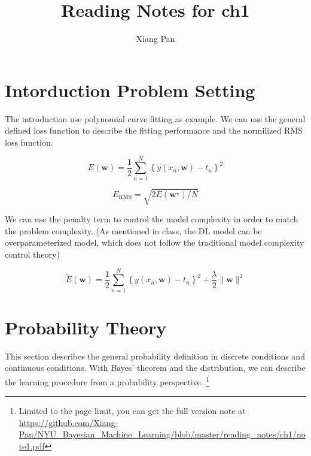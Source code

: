 \documentclass{article}
\title{Reading Notes for ch1}
\author{Xiang Pan}
\begin{document}

\section{Intorduction Problem Setting}
The introduction use polynomial curve fitting as example. We can use the general defined loss function to describe the fitting performance and the normilized RMS loss function.




$$E(\mathbf{w})=\frac{1}{2} \sum_{n=1}^{N}\left\{y\left(x_{n}, \mathbf{w}\right)-t_{n}\right\}^{2}$$

$$E_{\mathrm{RMS}}=\sqrt{2 E\left(\mathbf{w}^{\star}\right) / N}$$

We can use the penalty term to control the model complexity in order to match the problem complexity. (As mentioned in class, the DL model can be overparameterized model, which does not follow the traditional model complexity control theory)

$$\widetilde{E}(\mathbf{w})=\frac{1}{2} \sum_{n=1}^{N}\left\{y\left(x_{n}, \mathbf{w}\right)-t_{n}\right\}^{2}+\frac{\lambda}{2}\|\mathbf{w}\|^{2}$$

\section{Probability Theory} 
This section describes the general probability definition in discrete conditions and continuous conditions. With Bayes' theorem and the distribution, we can describe the learning procedure from a probability perspective. \footnote{Limited to the page limit, you can get the full version note at \url{https://github.com/Xiang-Pan/NYU_Bayesian_Machine_Learning/blob/master/reading_notes/ch1/note1.pdf} }
\end{document}
